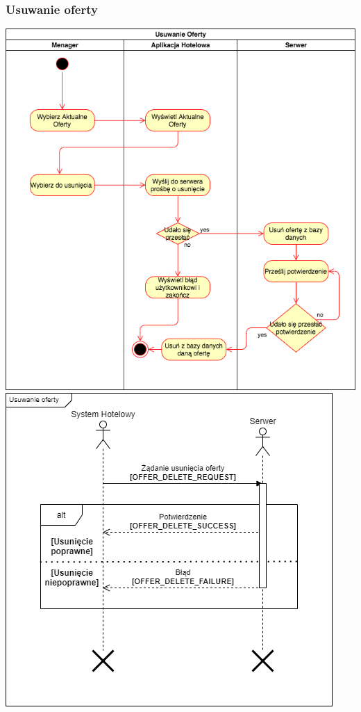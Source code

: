 \documentclass{article}
\begin{document}
\subsubsection{Usuwanie oferty}
\begin{center}
    \includegraphics[scale=0.5]{Aktywnosc/IO_Aktywności-Usuwanie oferty.png}
    \includegraphics[scale=0.65]{Sekwencje/Offer_Delete.png}
\end{center}
\end{document}
